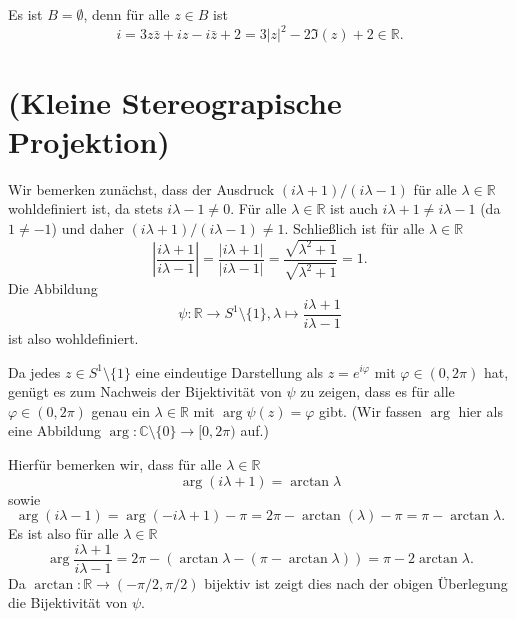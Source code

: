 \documentclass[a4paper,10pt]{article}
\theoremstyle{definition}
\newcommand{\R}{\mathbb{R}}
\newcommand{\C}{\mathbb{C}}
\begin{document}
\begin{center}
\end{center}





\subsection{}
Es ist $B = \emptyset$, denn für alle $z \in B$ ist
\[
 i = 3z\bar{z}+iz-i\bar{z}+2 = 3|z|^2 -2\Im(z) +2 \in \R.
\]





\section{(Kleine Stereograpische Projektion)}
Wir bemerken zunächst, dass der Ausdruck $(i\lambda+1)/(i\lambda-1)$ für alle $\lambda \in \R$ wohldefiniert ist, da stets $i\lambda-1 \neq 0$. Für alle $\lambda \in \R$ ist auch $i\lambda+1 \neq i\lambda-1$ (da $1 \neq -1$) und daher $(i\lambda+1)/(i\lambda-1) \neq 1$. Schließlich ist für alle $\lambda \in \R$
\[
 \left| \frac{i\lambda+1}{i\lambda-1} \right|
 = \frac{|i\lambda+1|}{|i\lambda-1|}
 = \frac{\sqrt{\lambda^2+1}}{\sqrt{\lambda^2+1}}
 = 1.
\]
Die Abbildung
\[
 \psi : \R \to S^1 \setminus \{1\}, \lambda \mapsto \frac{i\lambda+1}{i\lambda-1}
\]
ist also wohldefiniert.

Da jedes $z \in S^1 \setminus \{1\}$ eine eindeutige Darstellung als $z = e^{i\varphi}$ mit $\varphi \in (0,2\pi)$ hat, genügt es zum Nachweis der Bijektivität von $\psi$ zu zeigen, dass es für alle $\varphi \in (0,2\pi)$ genau ein $\lambda \in \R$ mit $\arg \psi(z) = \varphi$ gibt. (Wir fassen $\arg$ hier als eine Abbildung $\arg : \C \setminus \{0\} \to [0,2\pi)$ auf.)

Hierfür bemerken wir, dass für alle $\lambda \in \R$
\[
 \arg (i \lambda + 1) = \arctan \lambda
\]
sowie
\[
 \arg (i \lambda - 1) = \arg(-i \lambda + 1) - \pi = 2 \pi - \arctan (\lambda) - \pi = \pi - \arctan \lambda.
\]
Es ist also für alle $\lambda \in \R$
\[
 \arg \frac{i\lambda+1}{i\lambda-1}
 = 2\pi - \left( \arctan \lambda - (\pi - \arctan \lambda) \right)
 = \pi - 2\arctan \lambda.
\]
Da $\arctan : \R \to (-\pi/2,\pi/2)$ bijektiv ist zeigt dies nach der obigen Überlegung die Bijektivität von $\psi$.
\end{document}
